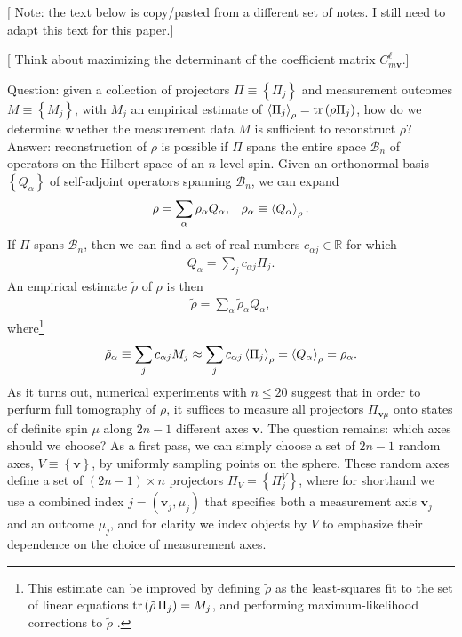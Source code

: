 \documentclass[nofootinbib,notitlepage,twocolumn]{revtex4-2}
\newcommand{\p}[1]{\left(#1\right)} %
\renewcommand{\set}[1]{\left\{#1\right\}} %
\newcommand{\bk}{\Braket} %
\renewcommand{\v}{\bm} %
\newcommand{\1}{\mathds{1}}
\newcommand{\B}{\mathcal{B}}
\newcommand{\RR}{\mathbb{R}}
\newcommand{\red}[1]{{\color{red} #1}}
\begin{document}
[\red{Note: the text below is copy/pasted from a different set of notes.  I still need to adapt this text for this paper.}]

[\red{Think about maximizing the determinant of the coefficient matrix $C_{m\v v}^\ell$.}]

Question: given a collection of projectors $\Pi\equiv\set{\Pi_j}$ and measurement outcomes $M\equiv\set{M_j}$, with $M_j$ an empirical estimate of $\bk{\Pi_j}_\rho=\tr\p{\rho\Pi_j}$, how do we determine whether the measurement data $M$ is sufficient to reconstruct $\rho$?
Answer: reconstruction of $\rho$ is possible if $\Pi$ spans the entire space $\B_n$ of operators on the Hilbert space of an $n$-level spin.
Given an orthonormal basis $\set{Q_\alpha}$ of self-adjoint operators spanning $\B_n$, we can expand
\begin{align}
  \rho = \sum_\alpha \rho_\alpha Q_\alpha,
  &&
  \rho_\alpha \equiv \bk{Q_\alpha}_\rho.
\end{align}
If $\Pi$ spans $\B_n$, then we can find a set of real numbers $c_{\alpha j}\in\RR$ for which
\begin{align}
  Q_\alpha = \sum_j c_{\alpha j} \Pi_j.
\end{align}
An empirical estimate $\tilde\rho$ of $\rho$ is then
\begin{align}
  \tilde\rho = \sum_\alpha \tilde\rho_\alpha Q_\alpha,
\end{align}
where\footnote{This estimate can be improved by defining $\tilde\rho$ as the least-squares fit to the set of linear equations $\tr\p{\tilde\rho\,\Pi_j} = M_j$, and performing maximum-likelihood corrections to $\tilde\rho$ \cite{smolin2012efficient}.}
\begin{align}
  \tilde\rho_\alpha \equiv \sum_j c_{\alpha j} M_j
  \approx \sum_j c_{\alpha j} \bk{\Pi_j}_\rho
  = \bk{Q_\alpha}_\rho
  = \rho_\alpha.
\end{align}
As it turns out, numerical experiments with $n\le20$ suggest that in order to perfurm full tomography of $\rho$, it suffices to measure all projectors $\Pi_{\v v\mu}$ onto states of definite spin $\mu$ along $2n-1$ different axes $\v v$.
The question remains: which axes should we choose?
As a first pass, we can simply choose a set of $2n-1$ random axes, $V\equiv\set{\v v}$, by uniformly sampling points on the sphere.
These random axes define a set of $\p{2n-1}\times n$ projectors $\Pi_V=\set{\Pi^V_j}$, where for shorthand we use a combined index $j=\p{\v v_j,\mu_j}$ that specifies both a measurement axis $\v v_j$ and an outcome $\mu_j$, and for clarity we index objects by $V$ to emphasize their dependence on the choice of measurement axes.
\end{document}
